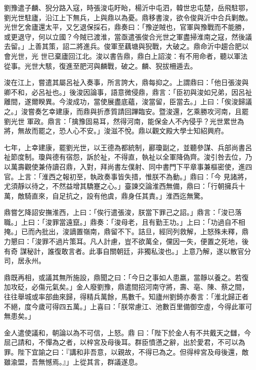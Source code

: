 \begin{pinyinscope}
 劉豫遣子麟、猊分路入寇，時張浚屯盱眙，楊沂中屯泗，韓世忠屯楚，岳飛駐鄂，劉光世駐廬，沿江上下無兵，上與鼎以為憂。鼎移書浚，欲令俊與沂中合兵剿敵。光世乞舍廬還太平，又乞退保採石，鼎奏曰：「豫逆賊也，官軍與豫戰而不能勝，或更退守，何以立國？今賊已渡淮，當亟遣張俊合光世之軍盡掃淮南之寇，然後議去留。」上善其策，詔二將進兵。俊軍至藕塘與猊戰，大破之。鼎命沂中趨合肥以會光世，光
 世已棄廬回江北。浚以書告鼎，鼎白上詔浚：有不用命者，聽以軍法從事。光世大駭，復進至肥河與麟戰，破之。麟、猊拔柵遁去。



 浚在江上，嘗遣其屬呂祉入奏事，所言誇大，鼎每抑之。上謂鼎曰：「他日張浚與卿不和，必呂祉也。」後浚因論事，語意微侵鼎，鼎言：「臣初與浚如兄弟，因呂祉離間，遂爾睽異。今浚成功，當使展盡底蘊，浚當留，臣當去。」上曰：「俟浚歸議之。」浚嘗奏乞幸建康，而鼎與折彥質請回蹕臨安。暨浚還，乞乘勝攻河南，且罷劉光世
 軍政。鼎言：「擒豫固易耳，然得河南，能保金人不內侵乎？光世累世為將，無故而罷之，恐人心不安。」浚滋不悅。鼎以觀文殿大學士知紹興府。



 七年，上幸建康，罷劉光世，以王德為都統制，酈瓊副之，並聽參謀、兵部尚書呂祉節度制。瓊與德有宿怨，訴於祉，不得直，執祉以全軍降偽齊。浚引咎去位，乃以萬壽觀使兼侍讀召鼎，入對，拜尚書左僕射、同中書門下平章事兼樞密使，進四官。上言：「淮西之報初至，執政奏事皆失措，惟朕不為動。」鼎曰：「今
 見諸將，尤須靜以待之，不然益增其驕蹇之心。」臺諫交論淮西無備，鼎曰：「行朝擁兵十萬，敵騎直來，自足抗之，設有他虞，鼎身任其責。」淮西迄無驚。



 鼎嘗乞降詔安撫淮西，上曰：「俟行遣張浚，朕當下罪己之詔。」鼎言：「浚已落職。」上曰：「浚罪當遠竄。」鼎奏：「浚母老，且有勤王功。」上曰：「功過自不相掩。」已而內批出，浚謫置嶺南，鼎留不下。詰旦，經同列救解，上怒殊未釋，鼎力懇曰：「浚罪不過片策耳。凡人計慮，豈不欲萬全，儻因一失，便置之死地，後有奇
 謀秘計，誰復敢言者。此事自關朝廷，非獨私浚也。」上意乃解，遂以散官分司，居永州。



 鼎既再相，或議其無所施設，鼎聞之曰：「今日之事如人患羸，當靜以養之。若復加攻砭，必傷元氣矣。」金人廢劉豫，鼎遣間招河南守將，壽、亳、陳、蔡之間，往往舉城或率部曲來歸，得精兵萬餘，馬數千。知廬州劉錡亦奏言：「淮北歸正者不絕，度今歲可得四五萬。」上喜曰：「朕常慮江、池數百里備御空虛，今得此軍可無患矣。」



 金人遣使議和，朝論以為不可信，上怒。鼎
 曰：「陛下於金人有不共戴天之讎，今屈己請和，不憚為之者，以梓宮及母後耳。群臣憤懣之辭，出於愛君，不可以為罪。陛下宜諭之曰：『講和非吾意，以親故，不得已為之。但得梓宮及母後還，敵雖渝盟，吾無憾焉。』」上從其言，群議遂息。




\end{pinyinscope}
